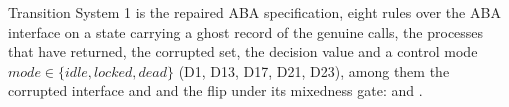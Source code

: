 \begin{definition}
  \label{def:aba-spec}
  \leanok
  Transition System 1 is the repaired ABA specification, eight rules over the ABA interface on a state carrying a ghost record of the genuine calls, the processes that have returned, the corrupted set, the decision value and a control mode $mode \in \{idle, locked, dead\}$ (D1, D13, D17, D21, D23), among them the corrupted interface  and  and the flip  under its mixedness gate:  and .
\end{definition}
